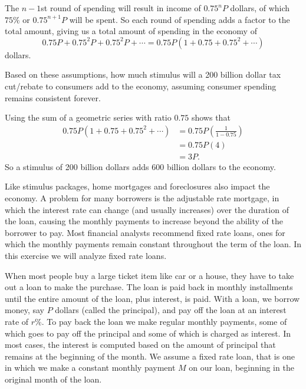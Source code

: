 \begin{exercises}
\begin{exerciseSolution}
The $n-1$st round of spending will result in income of $0.75^nP$ dollars, of which $75\%$ or $0.75^{n+1}P$ will be spent. So each round of spending adds a factor to the total amount, giving us a total amount of spending in the economy of
\[0.75P + 0.75^2P + 0.75^2P + \cdots = 0.75P(1+0.75+0.75^2+ \cdots )\]
dollars.

\end{exerciseSolution}

    \item Based on these assumptions, how much stimulus will a 200 billion dollar tax cut/rebate to consumers add to the economy, assuming consumer spending remains consistent forever.

\begin{exerciseSolution}

Using the sum of a geometric series with ratio $0.75$ shows that
\begin{align*}
0.75P(1+0.75+0.75^2+ \cdots ) &= 0.75P\left( \frac{1}{1-0.75} \right) \\
        &= 0.75P(4) \\
        &= 3P.
\end{align*}
So a stimulus of 200 billion dollars adds 600 billion dollars to the economy.

\end{exerciseSolution}

    \ea


\item Like stimulus packages, home mortgages and foreclosures also impact the economy. A problem for many borrowers is the adjustable rate mortgage, in which the interest rate can change (and usually increases) over the duration of the loan, causing the monthly payments to increase beyond the ability of the borrower to pay. Most financial analysts recommend fixed rate loans, ones for which the monthly payments remain constant throughout the term of the loan. In this exercise we will analyze fixed rate loans.

    When most people buy a large ticket item like car or a house, they have to take out a loan to make the purchase. The loan is paid back in monthly installments until the entire amount of the loan, plus interest, is paid. With a loan, we borrow money, say $P$ dollars (called the principal), and pay off the loan at an interest rate of $r$\%. To pay back the loan we make regular monthly payments, some of which goes to pay off the principal and some of which is charged as interest. In most cases, the interest is computed based on the amount of principal that remains at the beginning of the month. We assume a fixed rate loan, that is one in which we make a constant monthly payment $M$ on our loan, beginning in the original month of the loan.


\end{exercises}
